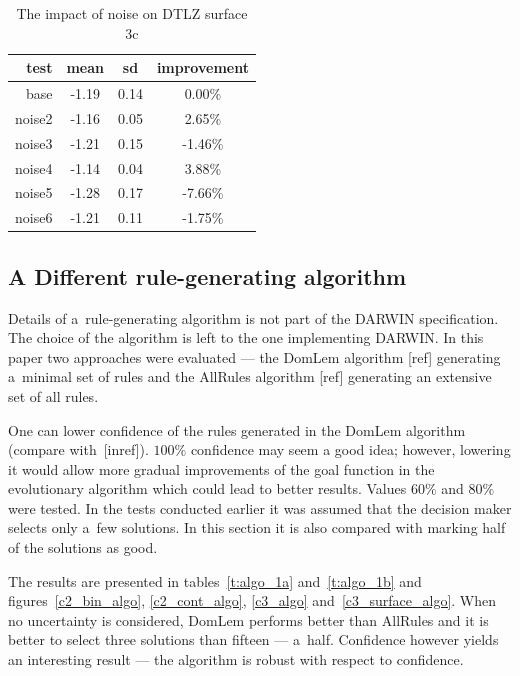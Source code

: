 \begin{table}[h]
  \centering
  \begin{tabular}{r c c c}
    \hline
    test & mean & sd & improvement  \\
    \hline
    \hline
    base & -1.19 & 0.14 & 0.00\%     \\
    noise2 & -1.16 & 0.05 & 2.65\%   \\
    noise3 & -1.21 & 0.15 & -1.46\%  \\
    noise4 & -1.14 & 0.04 & 3.88\%   \\
    noise5 & -1.28 & 0.17 & -7.66\%  \\
    noise6 & -1.21 & 0.11 & -1.75\%  \\
    \hline
  \end{tabular}
  \caption{The impact of noise on DTLZ surface 3c}
  \label{t:noise3}
\end{table}
\clearpage{}

\subsection{A Different rule-generating algorithm}
Details of a~rule-generating algorithm is not part of the DARWIN
specification. The choice of the algorithm is left to the one implementing
DARWIN. In this paper two approaches were evaluated --- the DomLem algorithm
[ref] generating a~minimal set of rules and the AllRules algorithm [ref]
generating an extensive set of all rules.

One can lower confidence of the rules generated in the DomLem algorithm
(compare with~[inref]). $100\%$ confidence may seem a good idea; however,
lowering it would allow more gradual improvements of the goal function in the
evolutionary algorithm which could lead to better results. Values $60\%$ and
$80\%$ were tested. In the tests conducted earlier it was assumed that the
decision maker selects only a~few solutions. In this section it is also
compared with marking half of the solutions as good.

The results are presented in tables~\ref{t:algo_1a} and~\ref{t:algo_1b} and
figures~\ref{c2_bin_algo}, \ref{c2_cont_algo}, \ref{c3_algo}
and~\ref{c3_surface_algo}. When no uncertainty is considered, DomLem performs
better than AllRules and it is better to select three solutions than fifteen
--- a~half. Confidence however yields an interesting result --- the algorithm
is robust with respect to confidence.


